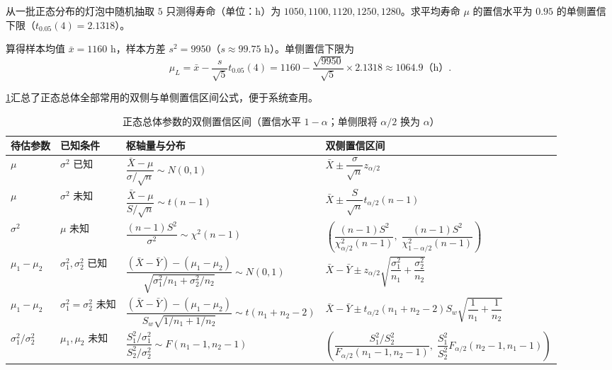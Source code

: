 \begin{example}[title={灯泡平均寿命的单侧置信下限}]
\label{eg:bulb-one-sided}
从一批正态分布的灯泡中随机抽取 $5$ 只测得寿命（单位：$\mathrm{h}$）为 $1050,1100,1120,1250,1280$。求平均寿命 $\mu$ 的置信水平为 $0.95$ 的单侧置信下限（$t_{0.05}(4)=2.1318$）。
\begin{solution}
算得样本均值 $\bar{x}=1160\text{ h}$，样本方差 $s^2=9950$（$s\approx 99.75\text{ h}$）。单侧置信下限为
\[
  \hat{\mu}_L=\bar{x}-\frac{s}{\sqrt{5}}t_{0.05}(4)
  =1160-\frac{\sqrt{9950}}{\sqrt{5}}\times 2.1318\approx 1064.9\text{（h）}.
\]
\end{solution}
\end{example}

\cref{tab:normal-ci-summary}汇总了正态总体全部常用的双侧与单侧置信区间公式，便于系统查用。

\begin{table}[htbp]
\centering
\caption{正态总体参数的双侧置信区间（置信水平 $1-\alpha$；单侧限将 $\alpha/2$ 换为 $\alpha$）}
\label{tab:normal-ci-summary}
\renewcommand{\arraystretch}{1.6}
\footnotesize
\begin{tabularx}{\textwidth}{@{}llXl@{}}
\toprule
待估参数 & 已知条件 & 枢轴量与分布 & 双侧置信区间 \\
\midrule
$\mu$ & $\sigma^2$ 已知 & $\dfrac{\bar{X}-\mu}{\sigma/\sqrt{n}}\sim N(0,1)$ & $\bar{X}\pm\dfrac{\sigma}{\sqrt{n}}z_{\alpha/2}$ \\
$\mu$ & $\sigma^2$ 未知 & $\dfrac{\bar{X}-\mu}{S/\sqrt{n}}\sim t(n-1)$ & $\bar{X}\pm\dfrac{S}{\sqrt{n}}t_{\alpha/2}(n-1)$ \\
$\sigma^2$ & $\mu$ 未知 & $\dfrac{(n-1)S^2}{\sigma^2}\sim\chi^2(n-1)$ & $\left(\dfrac{(n-1)S^2}{\chi_{\alpha/2}^2(n-1)},\;\dfrac{(n-1)S^2}{\chi_{1-\alpha/2}^2(n-1)}\right)$ \\
$\mu_1-\mu_2$ & $\sigma_1^2,\sigma_2^2$ 已知 & $\dfrac{(\bar{X}-\bar{Y})-(\mu_1-\mu_2)}{\sqrt{\sigma_1^2/n_1+\sigma_2^2/n_2}}\sim N(0,1)$ & $\bar{X}-\bar{Y}\pm z_{\alpha/2}\sqrt{\dfrac{\sigma_1^2}{n_1}+\dfrac{\sigma_2^2}{n_2}}$ \\
$\mu_1-\mu_2$ & $\sigma_1^2=\sigma_2^2$ 未知 & $\dfrac{(\bar{X}-\bar{Y})-(\mu_1-\mu_2)}{S_w\sqrt{1/n_1+1/n_2}}\sim t(n_1+n_2-2)$ & $\bar{X}-\bar{Y}\pm t_{\alpha/2}(n_1+n_2-2)S_w\sqrt{\dfrac{1}{n_1}+\dfrac{1}{n_2}}$ \\
$\sigma_1^2/\sigma_2^2$ & $\mu_1,\mu_2$ 未知 & $\dfrac{S_1^2/\sigma_1^2}{S_2^2/\sigma_2^2}\sim F(n_1-1,n_2-1)$ & $\left(\dfrac{S_1^2/S_2^2}{F_{\alpha/2}(n_1-1,n_2-1)},\;\dfrac{S_1^2}{S_2^2}F_{\alpha/2}(n_2-1,n_1-1)\right)$ \\
\bottomrule
\end{tabularx}
\end{table}

